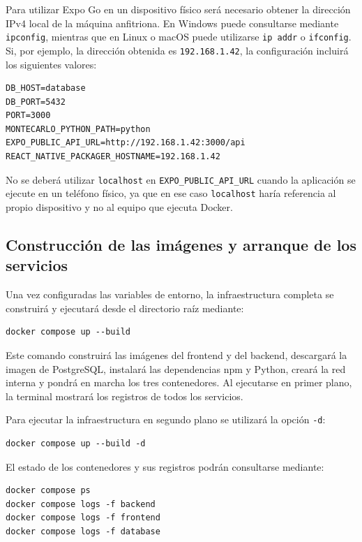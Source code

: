 Para utilizar Expo Go en un dispositivo f\'isico ser\'a necesario obtener la
direcci\'on IPv4 local de la m\'aquina anfitriona. En Windows puede consultarse
mediante \texttt{ipconfig}, mientras que en Linux o macOS puede utilizarse
\texttt{ip addr} o \texttt{ifconfig}. Si, por ejemplo, la direcci\'on obtenida es
\texttt{192.168.1.42}, la configuraci\'on incluir\'a los siguientes valores:

\begin{lstlisting}
DB_HOST=database
DB_PORT=5432
PORT=3000
MONTECARLO_PYTHON_PATH=python
EXPO_PUBLIC_API_URL=http://192.168.1.42:3000/api
REACT_NATIVE_PACKAGER_HOSTNAME=192.168.1.42
\end{lstlisting}

No se deber\'a utilizar \texttt{localhost} en
\texttt{EXPO\_PUBLIC\_API\_URL} cuando la aplicaci\'on se ejecute en un tel\'efono
f\'isico, ya que en ese caso \texttt{localhost} har\'ia referencia al propio
dispositivo y no al equipo que ejecuta Docker.

\subsection{Construcci\'on de las im\'agenes y arranque de los servicios}

Una vez configuradas las variables de entorno, la infraestructura completa se
construir\'a y ejecutar\'a desde el directorio ra\'iz mediante:

\begin{lstlisting}
docker compose up --build
\end{lstlisting}

Este comando construir\'a las im\'agenes del frontend y del backend, descargar\'a
la imagen de PostgreSQL, instalar\'a las dependencias npm y Python, crear\'a la red
interna y pondr\'a en marcha los tres contenedores. Al ejecutarse en primer plano,
la terminal mostrar\'a los registros de todos los servicios.

Para ejecutar la infraestructura en segundo plano se utilizar\'a la opci\'on
\texttt{-d}:

\begin{lstlisting}
docker compose up --build -d
\end{lstlisting}

El estado de los contenedores y sus registros podr\'an consultarse mediante:

\begin{lstlisting}
docker compose ps
docker compose logs -f backend
docker compose logs -f frontend
docker compose logs -f database
\end{lstlisting}

